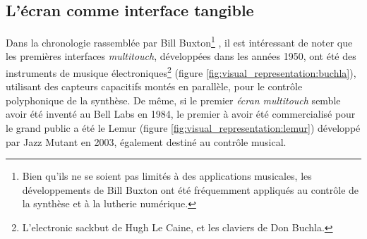 \subsection{L'écran comme interface tangible}

\noindent Dans la chronologie rassemblée par Bill Buxton\footnote{Bien qu'ils ne se soient pas limités à des applications musicales, les développements de Bill Buxton ont été fréquemment appliqués au contrôle de la synthèse et à la lutherie numérique.} \cite{buxton_multi-touch_2007}, il est intéressant de noter que les premières interfaces \textit{multitouch}, développées dans les années 1950, ont été des instruments de musique électroniques\footnote{L'electronic sackbut de Hugh Le Caine, et les claviers de Don Buchla.} (figure \ref{fig:visual_representation:buchla}), utilisant des capteurs capacitifs montés en parallèle, pour le contrôle polyphonique de la synthèse. De même, si le premier \textit{écran multitouch} semble avoir été inventé au Bell Labs en 1984, le premier à avoir été commercialisé pour le grand public a été le Lemur (figure \ref{fig:visual_representation:lemur}) développé par Jazz Mutant en 2003, également destiné au contrôle musical.\\
